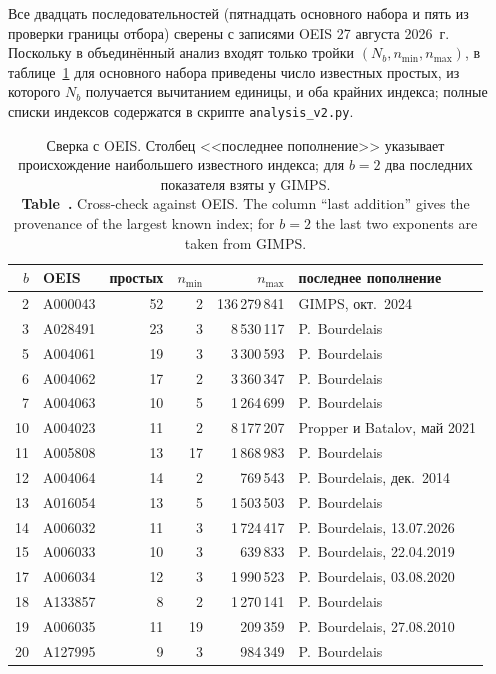 \documentclass[11pt,a4paper]{article}
\newcommand{\encaptab}[1]{\\[3pt]\foreignlanguage{english}{%
  \textbf{Table~\thetable.} #1}}
\theoremstyle{plain}
\theoremstyle{remark}
\begin{document}
Все двадцать последовательностей (пятнадцать основного набора и пять из проверки
границы отбора) сверены с записями OEIS 27 августа 2026~г.
Поскольку в объединённый анализ входят только тройки $(N_b,n_{\min},n_{\max})$,
в таблице~\ref{tab:verify} для основного набора приведены число известных простых, из которого
$N_b$ получается вычитанием единицы, и оба крайних индекса; полные списки
индексов содержатся в скрипте \texttt{analysis\_v2.py}.

\begin{table}[h]
\centering
\caption{Сверка с OEIS. Столбец <<последнее пополнение>> указывает происхождение
наибольшего известного индекса; для $b=2$ два последних показателя взяты у GIMPS.
\encaptab{Cross-check against OEIS. The column ``last addition'' gives the
provenance of the largest known index; for $b=2$ the last two exponents are taken
from GIMPS.}}
\label{tab:verify}
\small
\begin{tabular}{rlrrrl}
\toprule
$b$ & OEIS & простых & $n_{\min}$ & $n_{\max}$ & последнее пополнение\\
\midrule
2 & A000043 & 52 & 2 & 136\,279\,841 & GIMPS, окт.\ 2024\\
3 & A028491 & 23 & 3 & 8\,530\,117 & P.~Bourdelais\\
5 & A004061 & 19 & 3 & 3\,300\,593 & P.~Bourdelais\\
6 & A004062 & 17 & 2 & 3\,360\,347 & P.~Bourdelais\\
7 & A004063 & 10 & 5 & 1\,264\,699 & P.~Bourdelais\\
10 & A004023 & 11 & 2 & 8\,177\,207 & Propper и Batalov, май 2021\\
11 & A005808 & 13 & 17 & 1\,868\,983 & P.~Bourdelais\\
12 & A004064 & 14 & 2 & 769\,543 & P.~Bourdelais, дек.\ 2014\\
13 & A016054 & 13 & 5 & 1\,503\,503 & P.~Bourdelais\\
14 & A006032 & 11 & 3 & 1\,724\,417 & P.~Bourdelais, 13.07.2026\\
15 & A006033 & 10 & 3 & 639\,833 & P.~Bourdelais, 22.04.2019\\
17 & A006034 & 12 & 3 & 1\,990\,523 & P.~Bourdelais, 03.08.2020\\
18 & A133857 & 8 & 2 & 1\,270\,141 & P.~Bourdelais\\
19 & A006035 & 11 & 19 & 209\,359 & P.~Bourdelais, 27.08.2010\\
20 & A127995 & 9 & 3 & 984\,349 & P.~Bourdelais\\
\bottomrule
\end{tabular}
\end{table}
\end{document}
